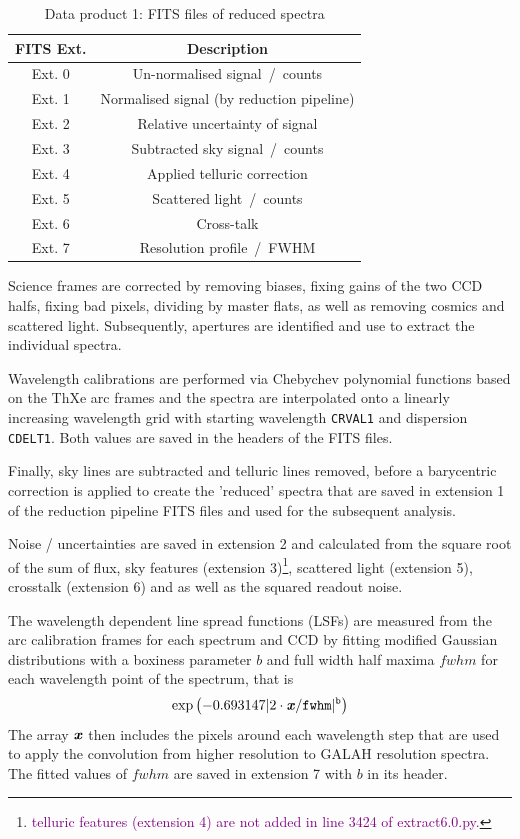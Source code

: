 \documentclass[
  journal=pasa,
  manuscript=research-paper, %
  year=2023,
  volume=37
]{cup-journal}
\newcommand{\SB}[1]{{\textcolor{purple}{#1}}}
\begin{document}
\begin{table}
    \centering
    \caption{Data product 1: FITS files of reduced spectra}
    \label{tab:reduction_fits}
    \begin{tabular}{c|c}
    \hline \hline
    FITS Ext. & Description \\
    \hline
    Ext. 0 & Un-normalised signal~/~counts \\
    Ext. 1 & Normalised signal (by reduction pipeline) \\
    Ext. 2 & Relative uncertainty of signal \\
    Ext. 3 & Subtracted sky signal~/~counts \\
    Ext. 4 & Applied telluric correction \\
    Ext. 5 & Scattered light~/~counts \\
    Ext. 6 & Cross-talk \\
    Ext. 7 & Resolution profile~/~FWHM \\
    \hline
    \end{tabular}
\end{table}

Science frames are corrected by removing biases, fixing gains of the two CCD halfs, fixing bad pixels, dividing by master flats, as well as removing cosmics and scattered light. Subsequently, apertures are identified and use to extract the individual spectra. 

Wavelength calibrations are performed via Chebychev polynomial functions based on the ThXe arc frames and the spectra are interpolated onto a linearly increasing wavelength grid with starting wavelength \texttt{CRVAL1} and dispersion \texttt{CDELT1}. Both values are saved in the headers of the FITS files.

Finally, sky lines are subtracted and telluric lines removed, before a barycentric correction is applied to create the 'reduced' spectra that are saved in extension 1 of the reduction pipeline FITS files and used for the subsequent analysis. 

Noise / uncertainties are saved in extension 2 and calculated from the square root of the sum of flux, sky features (extension 3)\footnote{\SB{telluric features (extension 4) are not added in line 3424 of extract6.0.py.}}, scattered light (extension 5), crosstalk (extension 6) and as well as the squared readout noise.

The wavelength dependent line spread functions (LSFs) are measured from the arc calibration frames for each spectrum and CCD by fitting modified Gaussian distributions with a boxiness parameter $b$ and full width half maxima $fwhm$ for each wavelength point of the spectrum, that is
\begin{align}
    \exp \left(-0.693147 \vert 2 \cdot \textbf{\textit{x}}/\texttt{fwhm}\vert^\texttt{b}\right) \label{eq:lsf}
\end{align}
The array $\textbf{\textit{x}}$ then includes the pixels around each wavelength step that are used to apply the convolution from higher resolution to GALAH resolution spectra. The fitted values of $fwhm$ are saved in extension 7 with $b$ in its header.
\end{document}

